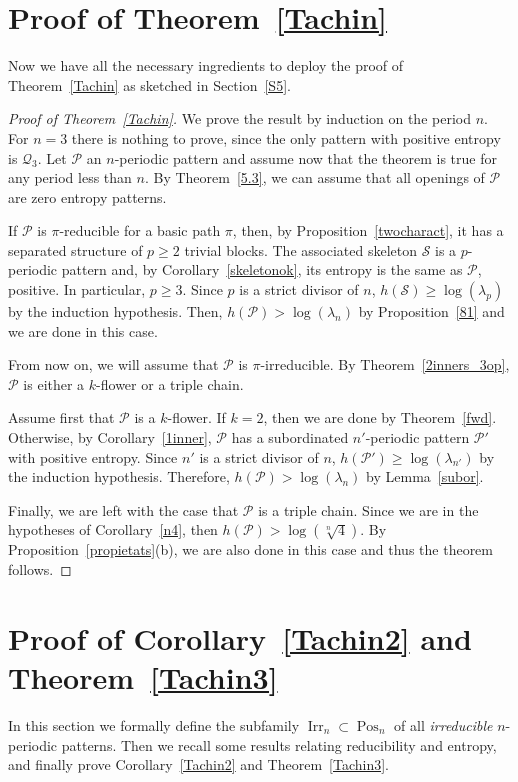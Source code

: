 \documentclass[a4paper]{amsart}
\theoremstyle{definition}
\DeclareMathOperator{\Pos}{Pos}
\DeclareMathOperator{\Irr}{Irr}
\begin{document}
\section{Proof of Theorem~\ref{Tachin}}\label{S10}
Now we have all the necessary ingredients to deploy the proof of Theorem~\ref{Tachin} as sketched in Section~\ref{S5}.

\begin{proof}[Proof of Theorem~\ref{Tachin}]
We prove the result by induction on the period $n$. For $n=3$ there is nothing to prove, since the only pattern with positive entropy is $\mathcal{Q}_3$. Let $\mathcal{P}$ an $n$-periodic pattern and assume now that the theorem is true for any period less than $n$. By Theorem~\ref{5.3}, we can assume that all openings of $\mathcal{P}$ are zero entropy patterns.

If $\mathcal{P}$ is $\pi$-reducible for a basic path $\pi$, then, by Proposition~\ref{twocharact}, it has a separated structure of $p\ge2$ trivial blocks. The associated skeleton $\mathcal{S}$ is a $p$-periodic pattern and, by Corollary~\ref{skeletonok}, its entropy is the same as $\mathcal{P}$, positive. In particular, $p\ge3$. Since $p$ is a strict divisor of $n$, $h(\mathcal{S})\ge\log(\lambda_p)$ by the induction hypothesis. Then, $h(\mathcal{P})>\log(\lambda_n)$ by Proposition~\ref{81} and we are done in this case.

From now on, we will assume that $\mathcal{P}$ is $\pi$-irreducible. By Theorem~\ref{2inners_3op}, $\mathcal{P}$ is either a $k$-flower or a triple chain.

Assume first that $\mathcal{P}$ is a $k$-flower. If $k=2$, then we are done by Theorem~\ref{fwd}. Otherwise, by Corollary~\ref{1inner}, $\mathcal{P}$ has a subordinated $n'$-periodic pattern $\mathcal{P}'$ with positive entropy. Since $n'$ is a strict divisor of $n$, $h(\mathcal{P}')\ge\log(\lambda_{n'})$ by the induction hypothesis. Therefore, $h(\mathcal{P})>\log(\lambda_n)$ by Lemma~\ref{subor}.

Finally, we are left with the case that $\mathcal{P}$ is a triple chain. Since we are in the hypotheses of Corollary~\ref{n4}, then $h(\mathcal{P})>\log(\sqrt[n]{4})$. By Proposition~\ref{propietats}(b), we are also done in this case and thus the theorem follows.
\end{proof}


\section{Proof of Corollary~\ref{Tachin2} and Theorem~\ref{Tachin3}}\label{S11}
In this section we formally define the subfamily $\Irr_n\subset\Pos_n$ of all \emph{irreducible} $n$-periodic patterns.
Then we recall some results relating reducibility and entropy, and finally prove Corollary~\ref{Tachin2} and Theorem~\ref{Tachin3}.
\end{document}
